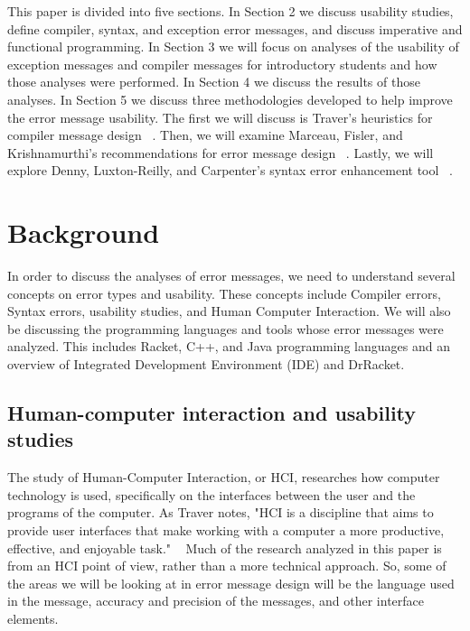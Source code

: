 \documentclass{sig-alternate}
\begin{document}
This paper is divided into five sections. In Section 2 we discuss usability studies, define compiler, syntax, and exception error messages, and discuss imperative and functional programming. In Section 3 we will focus on  analyses of the usability of exception messages and compiler messages for introductory students and how those analyses were performed. In Section 4 we discuss the results of those analyses. In Section 5 we discuss three methodologies developed to help improve the error message usability. The first we will discuss is Traver's heuristics for compiler message design ~\cite{Traver:2010}. Then, we will examine Marceau, Fisler, and Krishnamurthi's recommendations for error message design ~\cite{Marceau:2011:MYL:2048237.2048241}. Lastly, we will explore Denny, Luxton-Reilly, and Carpenter's syntax error enhancement tool ~\cite{Denny:2014:ESE:2591708.2591748}.



\section{Background}\label{background}
In order to discuss the analyses of error messages, we need to understand several concepts on error types and usability. These concepts include Compiler errors, Syntax errors, usability studies, and Human Computer Interaction. We will also be discussing the programming languages and tools whose error messages were analyzed. This includes Racket, C++, and Java programming languages and an overview of Integrated Development Environment (IDE) and DrRacket. 


\subsection{Human-computer interaction and usability studies}

The study of Human-Computer Interaction, or HCI, researches how computer technology is used, specifically on the interfaces between the user and the programs of the computer. As Traver notes, "HCI is a discipline that aims to provide user interfaces that make working with a computer a more productive, effective, and enjoyable task." ~\cite{Traver:2010} Much of the research analyzed in this paper is from an HCI point of view, rather than a more technical approach. So, some of the areas we will be looking at in error message design will be the language used in the message, accuracy and precision of the messages, and other interface elements. 
\end{document}
